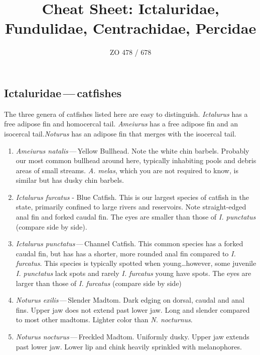 \documentclass[11pt]{article}
\title{Cheat Sheet: Ictaluridae, Fundulidae, Centrachidae, Percidae}
\author{ZO 478 / 678}
\date{}                                           %
\begin{document}
\maketitle

\subsection*{Ictaluridae\,—\,catfishes}

The three genera of catfishes listed here are easy to distinguish.  \textit{Ictalurus} has a free adipose fin and homocercal tail. \textit{Ameiurus} has a free adipose fin and an isocercal tail.\textit{Noturus} has an adipose fin that merges with the isocercal tail.

\begin{enumerate}
	\item \textit{Ameiurus natalis}\,—\,Yellow Bullhead.  Note the white chin barbels.  Probably our most common bullhead around here, typically inhabiting pools and debris areas of small streams. \textit{A. melas}, which you are not required to know, is similar but has dusky chin barbels.

	\item \textit{Ictalurus furcatus} - Blue Catfish.  This is our largest species of catfish in the state, primarily confined to large rivers and reservoirs.  Note straight-edged anal fin and forked caudal fin. The eyes are smaller than those of \textit{I. punctatus} (compare side by side).

	\item \textit{Ictalurus punctatus}\,—\,Channel Catfish.  This common species has a forked caudal fin, but has has a shorter, more rounded anal fin compared to \textit{I. furcatus}.  This species is typically spotted when young…however, some juvenile \textit{I. punctatus} lack spots and rarely \textit{I. furcatus} young have spots. The eyes are larger than those of \textit{I. furcatus} (compare side by side)

	\item \textit{Noturus exilis}\,—\,Slender Madtom.  Dark edging on dorsal, caudal and anal fins. Upper jaw does not extend past lower jaw. Long and slender compared to most other madtoms. Lighter color than \textit{N. nocturnus}.

	\item \textit{Noturus nocturus}\,—\,Freckled Madtom. Uniformly dusky. Upper jaw extends past lower jaw. Lower lip and chink heavily sprinkled with melanophores.

\end{enumerate}
\end{document}
